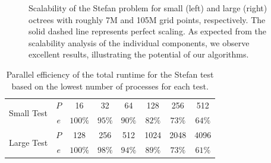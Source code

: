 \begin{figure}
\centering
{}
\caption{Scalability of the Stefan problem for small (left) and large (right) octrees with roughly 7M and 105M grid points, respectively. The solid dashed line represents perfect scaling. As expected from the scalability analysis of the individual components, we observe excellent results, illustrating the potential of our algorithms.}
\label{fig:stefan_scaling}
\end{figure}

\begin{table}
\centering
	\begin{tabular}{|l|c|cccccc|}
	\hline
	\multirow{2}{*}{Small Test} & $P$ & 16      & 32      & 64      & 128     & 256    & 512 \\ 	                            
	                            & $e$ & $100\%$ & $95\%$  & $90\%$  & $82\%$  & $73\%$ & $64\%$ \\
	\hline
	\multirow{2}{*}{Large Test} & $P$ & 128     & 256     & 512     & 1024    & 2048   & 4096 \\ 	                            
	                            & $e$ & $100\%$ & $98\%$  & $94\%$  & $89\%$  & $73\%$ & $61\%$ \\
	\hline
	\end{tabular}
	\caption{Parallel efficiency of the total runtime for the Stefan test based on the lowest number of processes for each test. }
	\label{tab:scaling_stefan} 
\end{table}

